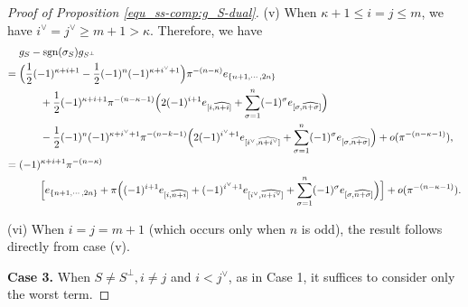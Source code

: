 \documentclass[pdflatex,sn-mathphys-num]{sn-jnl}%
\theoremstyle{thmstyleone}%
\theoremstyle{thmstyletwo}%
\numberwithin{equation}{subsection}
\theoremstyle{thmstylethree}%
\DeclareMathOperator{\sgn}{sgn}
\newcommand{\wh}{\widehat}
\begin{document}
\begin{proof}[Proof of Proposition \ref{equ_ss-comp:g_S-dual}]
\noindent (v) When $\kappa+1\leq i=j\leq m$, we have $i^\vee=j^\vee\geq m+1>\kappa$. Therefore, we have 
\begin{align*}
	&g_S-\sgn(\sigma_S)g_{S^\perp}\\
	={} &   \Bigl(\frac{1}{2}(-1)^{\kappa+i+1}-\frac{1}{2}(-1)^n
	(-1)^{\kappa+i^\vee+1}\Bigr)\pi^{-(n-\kappa)}e_{\{n+1,\cdots,2n\}}\\
	&\qquad   +\frac{1}{2}(-1)^{\kappa+i+1}\pi^{-(n-\kappa-1)}
	\Bigl(
	2(-1)^{i+1} e_{[i,\wh{n+i}]}+\sum_{\sigma=1}^n(-1)^\sigma e_{[\sigma,\wh{n+\sigma}]}
	\Bigr)\\
	&\qquad   -\frac{1}{2}(-1)^n(-1)^{\kappa+i^\vee+1}\pi^{-(n-k-1)}\Bigl(
	2(-1)^{i^\vee+1} e_{[i^\vee,\wh{n+i^\vee}]}+\sum_{\sigma=1}^n(-1)^\sigma e_{[\sigma,\wh{n+\sigma}]}\Bigr)+o(\pi^{-(n-\kappa-1)}),\\
	={} &   (-1)^{\kappa+i+1}\pi^{-(n-\kappa)}\\
		&\qquad\Bigl[e_{\{n+1,\cdots,2n\}}+\pi\Bigl(
		(-1)^{i+1} e_{[i,\wh{n+i}]}
		+(-1)^{i^\vee+1} e_{[i^\vee,\wh{n+i^\vee}]}
		+\sum_{\sigma=1}^n(-1)^\sigma  e_{[\sigma,\wh{n+\sigma}]}\Bigr)\Bigr]+o(\pi^{-(n-\kappa-1)}).
\end{align*}

\noindent (vi) When $i = j = m + 1$ (which occurs only when $n$ is odd), the result follows directly from case (v).

			
\bigskip
\noindent\textbf{Case 3.}	When $S\neq S^\perp,i\neq j$ and $i<j^\vee$, as in Case 1, it suffices to consider only the worst term.


\end{proof}
\end{document}
